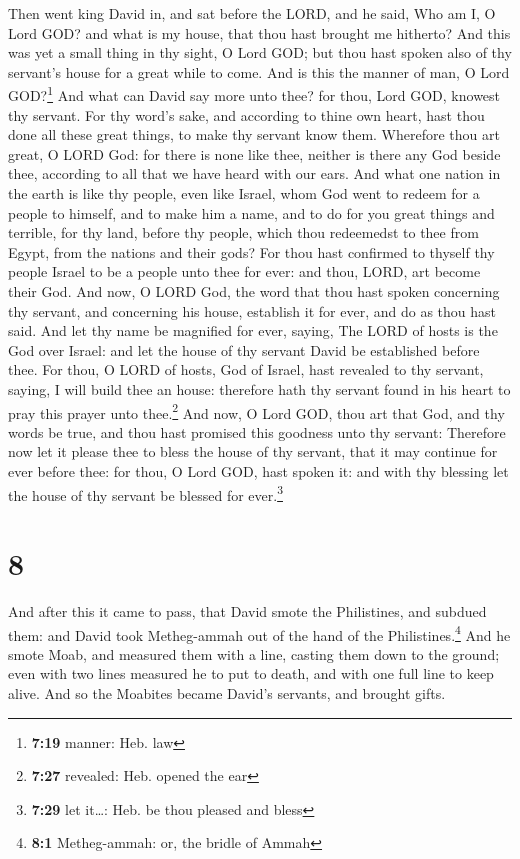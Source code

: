  Then went king David in, and sat before the LORD, and he
said, Who am I, O Lord GOD? and what is my house, that thou hast brought
me hitherto?  And this was yet a small thing in thy
sight, O Lord GOD; but thou hast spoken also of thy servant's house for
a great while to come. And is this the manner of man, O Lord
GOD?\footnote{\textbf{7:19} manner: Heb. law}  And what
can David say more unto thee? for thou, Lord GOD, knowest thy servant.
 For thy word's sake, and according to thine own heart,
hast thou done all these great things, to make thy servant know them.
 Wherefore thou art great, O LORD God: for there is none
like thee, neither is there any God beside thee, according to all that
we have heard with our ears.  And what one nation in the
earth is like thy people, even like Israel, whom God went to redeem for
a people to himself, and to make him a name, and to do for you great
things and terrible, for thy land, before thy people, which thou
redeemedst to thee from Egypt, from the nations and their gods?
 For thou hast confirmed to thyself thy people Israel to
be a people unto thee for ever: and thou, LORD, art become their God.
 And now, O LORD God, the word that thou hast spoken
concerning thy servant, and concerning his house, establish it for ever,
and do as thou hast said.  And let thy name be magnified
for ever, saying, The LORD of hosts is the God over Israel: and let the
house of thy servant David be established before thee. 
For thou, O LORD of hosts, God of Israel, hast revealed to thy servant,
saying, I will build thee an house: therefore hath thy servant found in
his heart to pray this prayer unto thee.\footnote{\textbf{7:27}
  revealed: Heb. opened the ear}  And now, O Lord GOD,
thou art that God, and thy words be true, and thou hast promised this
goodness unto thy servant:  Therefore now let it please
thee to bless the house of thy servant, that it may continue for ever
before thee: for thou, O Lord GOD, hast spoken it: and with thy blessing
let the house of thy servant be blessed for ever.\footnote{\textbf{7:29}
  let it\ldots: Heb. be thou pleased and bless}

\hypertarget{section-7}{%
\section{8}\label{section-7}}

 And after this it came to pass, that David smote the
Philistines, and subdued them: and David took Metheg-ammah out of the
hand of the Philistines.\footnote{\textbf{8:1} Metheg-ammah: or, the
  bridle of Ammah}  And he smote Moab, and measured them
with a line, casting them down to the ground; even with two lines
measured he to put to death, and with one full line to keep alive. And
so the Moabites became David's servants, and brought gifts.

